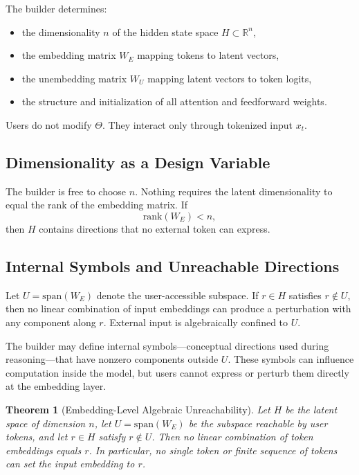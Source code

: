 \documentclass[11pt,a4paper]{article}
\newtheorem{theorem}{Theorem}[section]
\begin{document}
The builder determines:
\begin{itemize}
    \item the dimensionality $n$ of the hidden state space $H \subset \mathbb{R}^n$,
    \item the embedding matrix $W_E$ mapping tokens to latent vectors,
    \item the unembedding matrix $W_U$ mapping latent vectors to token logits,
    \item the structure and initialization of all attention and feedforward weights.
\end{itemize}

Users do not modify $\Theta$. They interact only through tokenized input $x_t$.

\subsection{Dimensionality as a Design Variable}

The builder is free to choose $n$. Nothing requires the latent dimensionality to equal the rank of the embedding matrix. If
\[
\text{rank}(W_E) < n,
\]
then $H$ contains directions that no external token can express.

\subsection{Internal Symbols and Unreachable Directions}

Let $U = \text{span}(W_E)$ denote the user-accessible subspace. If $r \in H$ satisfies $r \notin U$, then no linear combination of input embeddings can produce a perturbation with any component along $r$. External input is algebraically confined to $U$.

The builder may define internal symbols---conceptual directions used during reasoning---that have nonzero components outside $U$. These symbols can influence computation inside the model, but users cannot express or perturb them directly at the embedding layer.

\begin{theorem}[Embedding-Level Algebraic Unreachability]
\label{thm:embedding-unreachability}
Let $H$ be the latent space of dimension $n$, let $U = \text{span}(W_E)$ be the subspace reachable by user tokens, and let $r \in H$ satisfy $r \notin U$. Then no linear combination of token embeddings equals $r$. In particular, no single token or finite sequence of tokens can set the \emph{input embedding} to $r$.
\end{theorem}
\end{document}
